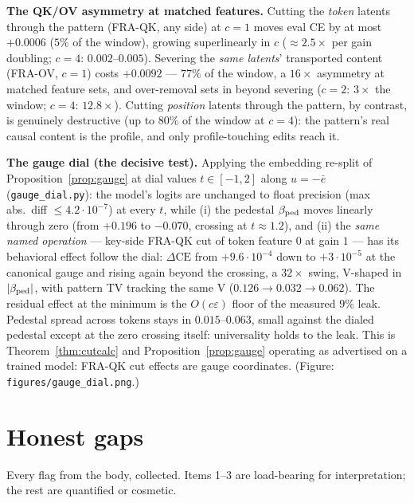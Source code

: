 \documentclass{article}
\begin{document}
\textbf{The QK/OV asymmetry at matched features.} Cutting the \emph{token} latents through the pattern (FRA-QK, any side) at $c = 1$ moves eval CE by at most $+0.0006$ ($5\%$ of the window), growing superlinearly in $c$ ($\approx 2.5\times$ per gain doubling; $c = 4$: $0.002$--$0.005$). Severing the \emph{same latents}' transported content (FRA-OV, $c = 1$) costs $+0.0092$ --- $77\%$ of the window, a $16\times$ asymmetry at matched feature sets, and over-removal sets in beyond severing ($c = 2$: $3\times$ the window; $c = 4$: $12.8\times$). Cutting \emph{position} latents through the pattern, by contrast, is genuinely destructive (up to $80\%$ of the window at $c = 4$): the pattern's real causal content is the profile, and only profile-touching edits reach it.

\textbf{The gauge dial (the decisive test).} Applying the embedding re-split of Proposition~\ref{prop:gauge} at dial values $t \in [-1, 2]$ along $u = -\bar e$ (\texttt{gauge\_dial.py}): the model's logits are unchanged to float precision (max abs.\ diff $\le 4.2\cdot10^{-7}$) at every $t$, while (i) the pedestal $\beta_{\mathrm{ped}}$ moves linearly through zero (from $+0.196$ to $-0.070$, crossing at $t \approx 1.2$), and (ii) the \emph{same named operation} --- key-side FRA-QK cut of token feature $0$ at gain $1$ --- has its behavioral effect follow the dial: $\Delta\mathrm{CE}$ from $+9.6\cdot10^{-4}$ down to $+3\cdot10^{-5}$ at the canonical gauge and rising again beyond the crossing, a $32\times$ swing, V-shaped in $|\beta_{\mathrm{ped}}|$, with pattern TV tracking the same V ($0.126 \to 0.032 \to 0.062$). The residual effect at the minimum is the $O(c\varepsilon)$ floor of the measured $9\%$ leak. Pedestal spread across tokens stays in $0.015$--$0.063$, small against the dialed pedestal except at the zero crossing itself: universality holds to the leak. This is Theorem~\ref{thm:cutcalc} and Proposition~\ref{prop:gauge} operating as advertised on a trained model: FRA-QK cut effects are gauge coordinates. (Figure: \texttt{figures/gauge\_dial.png}.)

\section{Honest gaps}\label{sec:gaps}

Every flag from the body, collected. Items 1--3 are load-bearing for interpretation; the rest are quantified or cosmetic.
\end{document}
